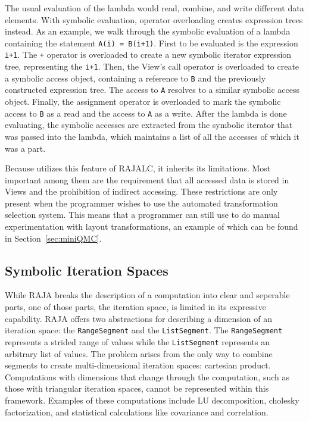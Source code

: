 The usual evaluation of the lambda would read, combine, and write different data elements.
With symbolic evaluation, operator overloading creates expression trees instead.
As an example, we walk through the symbolic evaluation of a lambda containing the statement \verb.A(i) = B(i+1)..
First to be evaluated is the expression \verb.i+1.. 
The \verb.+. operator is overloaded to create a new symbolic iterator expression tree, representing the \verb.i+1.. 
Then, the View's call operator is overloaded to create a symbolic access object, containing a reference to \verb.B. and the previously constructed expression tree.
The access to \verb.A. resolves to a similar symbolic access object.
Finally, the assignment operator is overloaded to mark the symbolic access to \verb.B. as a read and the access to \verb.A. as a write.
After the lambda is done evaluating, the symbolic accesses are extracted from the symbolic iterator that was passed into the lambda, which maintains a list of all the accesses of which it was a part.

Because \FormatDecisions{} utilizes this feature of RAJALC, it inherits its limitations.
Most important among them are the requirement that all accessed data is stored in Views and the prohibition of indirect accessing.
These restrictions are only present when the programmer wishes to use the automated transformation selection system. 
This means that a programmer can still use \FormatDecisions{} to do manual experimentation with layout transformations, an example of which can be found in Section~\ref{sec:miniQMC}.

\subsection{Symbolic Iteration Spaces}
\label{sec:SymbolicSegment}
While RAJA breaks the description of a computation into clear and seperable parts, one of those parts, the iteration space, is limited in its expressive capability.
RAJA offers two abstractions for describing a dimension of an iteration space: the \verb.RangeSegment. and the \verb.ListSegment..
The \verb.RangeSegment. represents a strided range of values while the \verb.ListSegment. represents an arbitrary list of values.
The problem arises from the only way to combine segments to create multi-dimensional iteration spaces: cartesian product.
Computations with dimensions that change through the computation, such as those with triangular iteration spaces, cannot be represented within this framework.
Examples of these computations include LU decomposition, cholesky factorization, and statistical calculations like covariance and correlation.

